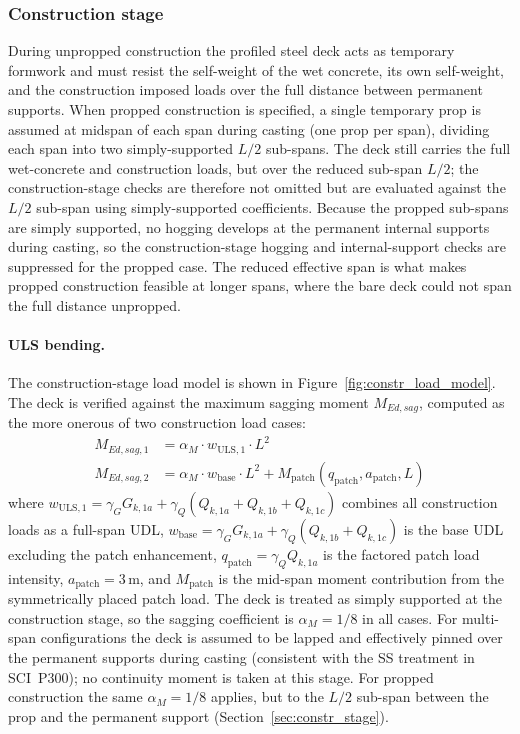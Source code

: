 \subsubsection*{Construction stage}
\label{sec:constr_stage}
During unpropped construction the profiled steel deck acts as temporary formwork and must resist the self-weight of the wet concrete, its own self-weight, and the construction imposed loads over the full distance between permanent supports. When propped construction is specified, a single temporary prop is assumed at midspan of each span during casting (one prop per span), dividing each span into two simply-supported $L/2$ sub-spans. The deck still carries the full wet-concrete and construction loads, but over the reduced sub-span $L/2$; the construction-stage checks are therefore not omitted but are evaluated against the $L/2$ sub-span using simply-supported coefficients. Because the propped sub-spans are simply supported, no hogging develops at the permanent internal supports during casting, so the construction-stage hogging and internal-support checks are suppressed for the propped case. The reduced effective span is what makes propped construction feasible at longer spans, where the bare deck could not span the full distance unpropped.

\paragraph{ULS bending.} The construction-stage load model is shown in Figure~\ref{fig:constr_load_model}. The deck is verified against the maximum sagging moment $M_{Ed,sag}$, computed as the more onerous of two construction load cases:
\begin{align}
    M_{Ed,sag,1} &= \alpha_M \cdot w_\mathrm{ULS,1} \cdot L^2
    \label{eq:constr_sag_1} \\
    M_{Ed,sag,2} &= \alpha_M \cdot w_\mathrm{base} \cdot L^2 + M_\mathrm{patch}(q_\mathrm{patch}, a_\mathrm{patch}, L)
    \label{eq:constr_sag_2}
\end{align}
where $w_\mathrm{ULS,1} = \gamma_G G_{k,1a} + \gamma_Q (Q_{k,1a} + Q_{k,1b} + Q_{k,1c})$ combines all construction loads as a full-span UDL, $w_\mathrm{base} = \gamma_G G_{k,1a} + \gamma_Q (Q_{k,1b} + Q_{k,1c})$ is the base UDL excluding the patch enhancement, $q_\mathrm{patch} = \gamma_Q Q_{k,1a}$ is the factored patch load intensity, $a_\mathrm{patch} = 3$\,m, and $M_\mathrm{patch}$ is the mid-span moment contribution from the symmetrically placed patch load. The deck is treated as simply supported at the construction stage, so the sagging coefficient is $\alpha_M = 1/8$ in all cases. For multi-span configurations the deck is assumed to be lapped and effectively pinned over the permanent supports during casting (consistent with the SS treatment in SCI~P300); no continuity moment is taken at this stage. For propped construction the same $\alpha_M = 1/8$ applies, but to the $L/2$ sub-span between the prop and the permanent support (Section~\ref{sec:constr_stage}).

